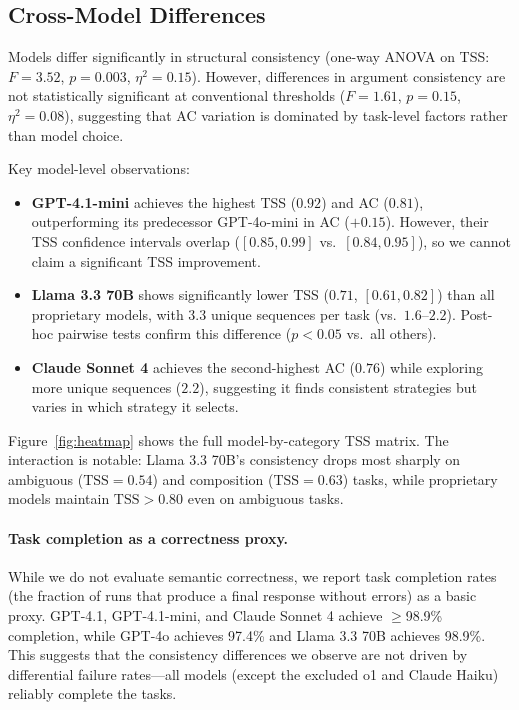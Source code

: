 \documentclass[letterpaper]{article}
\begin{document}
\subsection{Cross-Model Differences}
\label{sec:model_comparison}

Models differ significantly in structural consistency (one-way ANOVA on TSS: $F = 3.52$, $p = 0.003$, $\eta^2 = 0.15$). However, differences in argument consistency are not statistically significant at conventional thresholds ($F = 1.61$, $p = 0.15$, $\eta^2 = 0.08$), suggesting that AC variation is dominated by task-level factors rather than model choice.

Key model-level observations:

\begin{itemize}[nosep]
    \item \textbf{GPT-4.1-mini} achieves the highest TSS ($0.92$) and AC ($0.81$), outperforming its predecessor GPT-4o-mini in AC ($+0.15$). However, their TSS confidence intervals overlap ($[0.85, 0.99]$ vs.\ $[0.84, 0.95]$), so we cannot claim a significant TSS improvement.
    \item \textbf{Llama 3.3 70B} shows significantly lower TSS ($0.71$, $[0.61, 0.82]$) than all proprietary models, with $3.3$ unique sequences per task (vs.\ $1.6$--$2.2$). Post-hoc pairwise tests confirm this difference ($p < 0.05$ vs.\ all others).
    \item \textbf{Claude Sonnet 4} achieves the second-highest AC ($0.76$) while exploring more unique sequences ($2.2$), suggesting it finds consistent strategies but varies in which strategy it selects.
\end{itemize}

Figure~\ref{fig:heatmap} shows the full model-by-category TSS matrix. The interaction is notable: Llama 3.3 70B's consistency drops most sharply on ambiguous ($\text{TSS} = 0.54$) and composition ($\text{TSS} = 0.63$) tasks, while proprietary models maintain $\text{TSS} > 0.80$ even on ambiguous tasks.

\paragraph{Task completion as a correctness proxy.} While we do not evaluate semantic correctness, we report task completion rates (the fraction of runs that produce a final response without errors) as a basic proxy. GPT-4.1, GPT-4.1-mini, and Claude Sonnet 4 achieve $\geq$98.9\% completion, while GPT-4o achieves 97.4\% and Llama 3.3 70B achieves 98.9\%. This suggests that the consistency differences we observe are not driven by differential failure rates---all models (except the excluded o1 and Claude Haiku) reliably complete the tasks.
\end{document}
